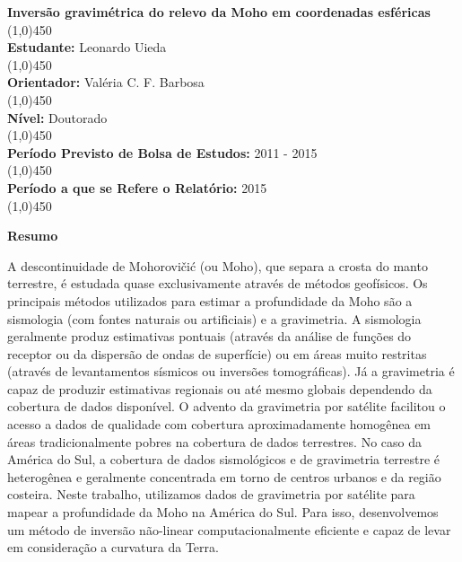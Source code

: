 \documentclass[12pt]{letter}
\begin{document}
\thispagestyle{fancy}

\begin{flushleft}

\textbf{Inversão gravimétrica do relevo da Moho em coordenadas esféricas}\\
\line(1,0){450}
\\\textbf{Estudante:} Leonardo Uieda\\
\line(1,0){450}
\\\textbf{Orientador:} Valéria C. F. Barbosa\\
\line(1,0){450}
\\\textbf{Nível:} Doutorado\\
\line(1,0){450}
\\\textbf{Período Previsto de Bolsa de Estudos:} 2011 - 2015\\
\line(1,0){450}
\\\textbf{Período a que se Refere o Relatório:} 2015\\
\line(1,0){450}

\end{flushleft}

\textbf{Resumo}


A descontinuidade de Mohorovičić (ou Moho), que separa a crosta do manto
terrestre, é estudada quase exclusivamente através de métodos geofísicos.
Os principais métodos utilizados para estimar a profundidade da Moho são a
sismologia (com fontes naturais ou artificiais) e a gravimetria.
A sismologia geralmente produz estimativas pontuais (através da análise de
funções do receptor ou da dispersão de ondas de superfície) ou em áreas muito
restritas (através de levantamentos sísmicos ou inversões tomográficas).
Já a gravimetria é capaz de produzir estimativas regionais ou até mesmo
globais dependendo da cobertura de dados disponível.
O advento da gravimetria por satélite facilitou o acesso a dados de qualidade
com cobertura aproximadamente homogênea em áreas tradicionalmente pobres na
cobertura de dados terrestres.
No caso da América do Sul, a cobertura de dados sismológicos e de gravimetria
terrestre é heterogênea e geralmente concentrada em torno de centros urbanos e
da região costeira.
Neste trabalho, utilizamos dados de gravimetria por satélite para mapear a
profundidade da Moho na América do Sul.
Para isso, desenvolvemos um método de inversão não-linear computacionalmente
eficiente e capaz de levar em consideração a curvatura da Terra.
\end{document}
